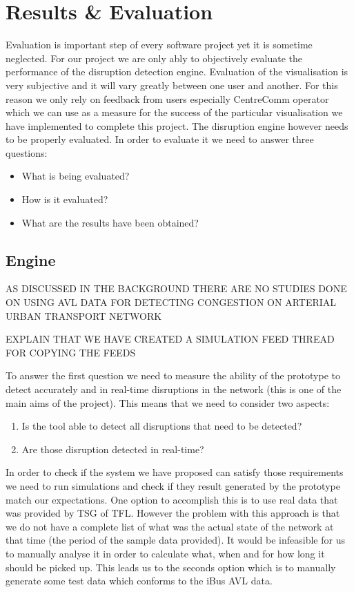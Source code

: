 \chapter{Results \& Evaluation}
Evaluation is important step of every software project yet it is sometime neglected. For our project we  are only ably to objectively evaluate the performance of the disruption detection engine. Evaluation of the visualisation is very subjective and it will vary greatly between one user and another. For this reason we only rely on feedback from users especially CentreComm operator which we can use as a measure for the success of the particular visualisation we have implemented to complete this project. The disruption engine however needs to be properly evaluated. In order to evaluate it we need to answer three questions:
\begin{itemize}
	\item What is being evaluated?
	\item How is it evaluated?
	\item What are the results have been obtained?
\end{itemize}
\section{Engine}
AS DISCUSSED IN THE BACKGROUND THERE ARE NO STUDIES DONE ON USING AVL DATA FOR DETECTING CONGESTION ON ARTERIAL URBAN TRANSPORT NETWORK

EXPLAIN THAT WE HAVE CREATED A SIMULATION FEED THREAD FOR COPYING THE FEEDS

To answer the first question we need to measure the ability of the prototype to detect accurately and in real-time disruptions in the network (this is one of the main aims of the project). This means that we need to consider two aspects:
\begin{enumerate}
	\item Is the tool able to detect all disruptions that need to be detected?
	\item Are those disruption detected in real-time?
\end{enumerate}

In order to check if the system we have proposed can satisfy those requirements we need to run simulations and check if they result generated by the prototype match our expectations. One option to accomplish this is to use real data that was provided by TSG of TFL. However the problem with this approach is that we do not have a complete list of what was the actual state of the network at that time (the period of the sample data provided). It would be infeasible for us to manually analyse it in order to calculate what, when and for how long it should be picked up. This leads us to the seconds option which is to manually generate some test data which conforms to the iBus AVL data.

